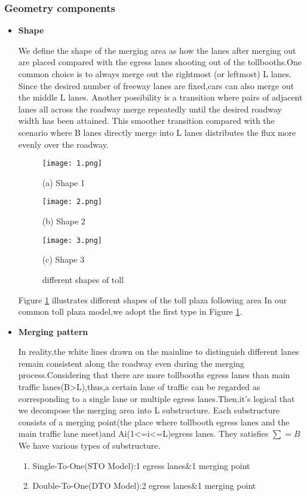  \subsubsection{Geometry components}
 \begin{itemize}
\item{\textbf{Shape}}

We define the shape of the merging area as how the lanes after merging out are placed compared with the egress lanes shooting out of the tollbooths.One common choice is to always merge out the rightmost (or leftmost) L lanes. Since the desired number of freeway lanes are fixed,cars can also merge out  the middle L lanes. Another possibility is a transition where pairs of adjacent lanes all across the roadway merge repeatedly until the desired roadway width has been attained. This smoother transition compared with the scenario where B lanes directly merge into L lanes distributes the flux more evenly over the roadway.


\begin{figure}[h]
\begin{minipage}{0.3\linewidth}
  \centerline{\texttt{[image: 1.png]}}
  \centerline{(a) Shape 1}
\end{minipage}
\hfill
\begin{minipage}{.3\linewidth}
  \centerline{\texttt{[image: 2.png]}}
  \centerline{(b) Shape 2}
\end{minipage}
\hfill
\begin{minipage}{.3\linewidth}
  \centerline{\texttt{[image: 3.png]}}
  \centerline{(c) Shape 3}
\end{minipage}
\caption{different shapes of toll}
\label{meterial}
\end{figure}

Figure \ref{meterial} illustrates different shapes of the toll plaza following area
In our common toll plaza model,we adopt the first type in Figure \ref{meterial}.

\item{\textbf{Merging pattern}}

In reality,the white lines drawn on the mainline to distinguish different lanes remain consistent along the roadway even during the merging process.Considering that there are more tollbooths egress lanes than main traffic lanes(B>L),thus,a certain lane of traffic can be regarded as corresponding to a single lane or multiple egress lanes.Then,it's logical that we decompose the merging area into L substructure.  Each substructure consists of a merging point(the place where tollbooth egress lanes and the main traffic lane meet)and Ai(1<=i<=L)egress lanes.
They satisfies $\sum{} = B$
We have various types of substructure.
\begin{enumerate}[1)]
\item
Single-To-One(STO Model):1 egress lanes\&1 merging point
\item
Double-To-One(DTO Model):2 egress lanes\&1 merging point
\end{enumerate}


\end{itemize}
